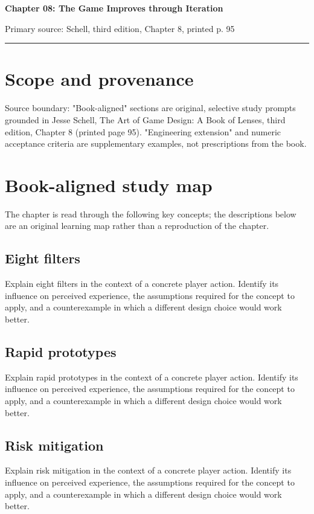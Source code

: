 \documentclass[11pt]{article}
\begin{document}
{\huge\bfseries\color{suiteblue} Chapter 08: The Game Improves through Iteration}\par
\vspace{0.15in}
{\normalsize\color{suitegray} Primary source: Schell, third edition, Chapter 8, printed p. 95}\par
\vspace{0.15in}\hrule\vspace{0.15in}

\section{Scope and provenance}
Source boundary: "Book-aligned" sections are original, selective study prompts grounded in Jesse Schell, The Art of Game Design: A Book of Lenses, third edition, Chapter 8 (printed page 95). "Engineering extension" and numeric acceptance criteria are supplementary examples, not prescriptions from the book.


\section{Book-aligned study map}
The chapter is read through the following key concepts; the descriptions below are an original learning map rather than a reproduction of the chapter.


\subsection{Eight filters}
Explain eight filters in the context of a concrete player action. Identify its influence on perceived experience, the assumptions required for the concept to apply, and a counterexample in which a different design choice would work better.


\subsection{Rapid prototypes}
Explain rapid prototypes in the context of a concrete player action. Identify its influence on perceived experience, the assumptions required for the concept to apply, and a counterexample in which a different design choice would work better.


\subsection{Risk mitigation}
Explain risk mitigation in the context of a concrete player action. Identify its influence on perceived experience, the assumptions required for the concept to apply, and a counterexample in which a different design choice would work better.
\end{document}
